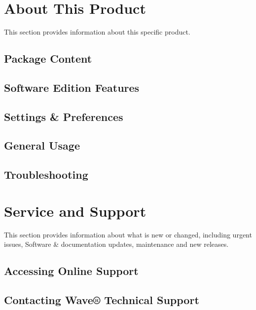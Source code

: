 \documentclass[letterpaper,10pt,openany,oneside,english]{sphinxmanual}
\begin{document}
\chapter{About This Product}
\label{\detokenize{thisproduct:about-this-product}}\label{\detokenize{thisproduct::doc}}
This section provides information about this specific product.


\section{Package Content}
\label{\detokenize{thisproduct:package-content}}

\section{Software Edition Features}
\label{\detokenize{thisproduct:software-edition-features}}

\section{Settings \& Preferences}
\label{\detokenize{thisproduct:settings-preferences}}

\section{General Usage}
\label{\detokenize{thisproduct:general-usage}}

\section{Troubleshooting}
\label{\detokenize{thisproduct:troubleshooting}}

\chapter{Service and Support}
\label{\detokenize{serviceandsupport:service-and-support}}\label{\detokenize{serviceandsupport::doc}}
This section provides information about what is new or changed, including urgent issues, Software \& documentation updates, maintenance and new releases.


\section{Accessing Online Support}
\label{\detokenize{serviceandsupport:accessing-online-support}}

\section{Contacting Wave® Technical Support}
\label{\detokenize{serviceandsupport:contacting-wave-technical-support}}
\end{document}
